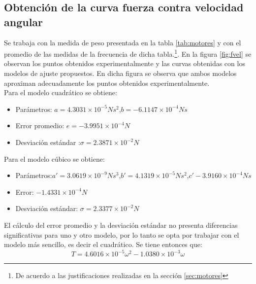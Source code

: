 \documentclass[main]{subfiles}
\begin{document}
\subsection{Obtenci\'on de la curva fuerza contra velocidad angular}

Se trabaja con la medida de peso presentada en la tabla \ref{tab:motores} y con el promedio de las medidas de la frecuencia de dicha tabla.\footnote{De acuerdo a las justificaciones realizadas en la secci\'on \ref{sec:motores}}. En la figura \ref{fig:fvel} se observan los puntos obtenidos experimentalmente y las curvas obtenidas con los modelos de ajuste propuestos. En dicha figura se observa que ambos modelos aproximan adecuadamente los puntos obtenidos experimentalmente.\\

Para el modelo cuadr\'atico se obtiene:
\begin{itemize}
\item Par\'ametros: \newline$a=4.3031\times10^{-5}Ns^2$,\newline$b=-6.1147\times 10^{-4}Ns$
\item Error promedio: $e=-3.9951\times 10 ^{-4}N$
\item Desviaci\'on est\'andar :$\sigma=2.3871\times10^{-2}N$
\end{itemize}

Para el modelo c\'ubico se obtiene:
\begin{itemize}
\item Par\'ametros:\newline$a\prime = 3.0619\times 10^{-9}Ns^3$,\newline$b\prime =4.1319\times10^{-5}Ns^2$,\newline$c\prime -3.9160\times10^{-4}Ns$
\item Error: $-1.4331\times10^{-4}N$
\item Desviaci\'on est\'andar: $\sigma=2.3377\times 10^{-2}N$
\end{itemize}

El c\'alculo del error promedio y la desviaci\'on est\'andar no presenta diferencias significativas para uno y otro modelo, por lo tanto se opta por trabajar con el modelo m\'as sencillo, es decir el cuadr\'atico. Se tiene entonces que:
\begin{equation}
T=4.6016\times10^{-5}\omega^2-1.0380\times10^{-3}\omega
\end{equation}
\end{document}
